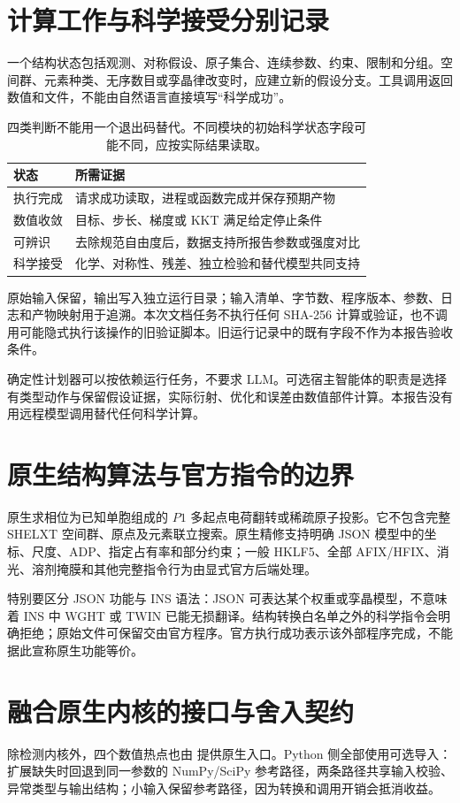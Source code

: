 \section{计算工作与科学接受分别记录}
一个结构状态包括观测、对称假设、原子集合、连续参数、约束、限制和分组。空间群、元素种类、无序数目或孪晶律改变时，应建立新的假设分支。工具调用返回数值和文件，不能由自然语言直接填写“科学成功”。
\begin{table}[htbp]\centering\small
\begin{tabularx}{\textwidth}{p{27mm}X}
\toprule 状态 & 所需证据\\\midrule
执行完成 & 请求成功读取，进程或函数完成并保存预期产物\\
数值收敛 & 目标、步长、梯度或 KKT 满足给定停止条件\\
可辨识 & 去除规范自由度后，数据支持所报告参数或强度对比\\
科学接受 & 化学、对称性、残差、独立检验和替代模型共同支持\\
\bottomrule
\end{tabularx}
\caption{四类判断不能用一个退出码替代。不同模块的初始科学状态字段可能不同，应按实际结果读取。}
\end{table}
原始输入保留，输出写入独立运行目录；输入清单、字节数、程序版本、参数、日志和产物映射用于追溯。本次文档任务不执行任何 SHA-256 计算或验证，也不调用可能隐式执行该操作的旧验证脚本。旧运行记录中的既有字段不作为本报告验收条件。

确定性计划器可以按依赖运行任务，不要求 LLM。可选宿主智能体的职责是选择有类型动作与保留假设证据，实际衍射、优化和误差由数值部件计算。本报告没有用远程模型调用替代任何科学计算。
\section{原生结构算法与官方指令的边界}
原生求相位为已知单胞组成的 $P1$ 多起点电荷翻转或稀疏原子投影。它不包含完整 SHELXT 空间群、原点及元素联立搜索。原生精修支持明确 JSON 模型中的坐标、尺度、ADP、指定占有率和部分约束；一般 HKLF5、全部 AFIX/HFIX、消光、溶剂掩膜和其他完整指令行为由显式官方后端处理。

特别要区分 JSON 功能与 INS 语法：JSON 可表达某个权重或孪晶模型，不意味着 INS 中 WGHT 或 TWIN 已能无损翻译。结构转换白名单之外的科学指令会明确拒绝；原始文件可保留交由官方程序。官方执行成功表示该外部程序完成，不能据此宣称原生功能等价。
\section{融合原生内核的接口与舍入契约}
除检测内核外，四个数值热点也由  提供原生入口。Python 侧全部使用可选导入：扩展缺失时回退到同一参数的 NumPy/SciPy 参考路径，两条路径共享输入校验、异常类型与输出结构；小输入保留参考路径，因为转换和调用开销会抵消收益。

